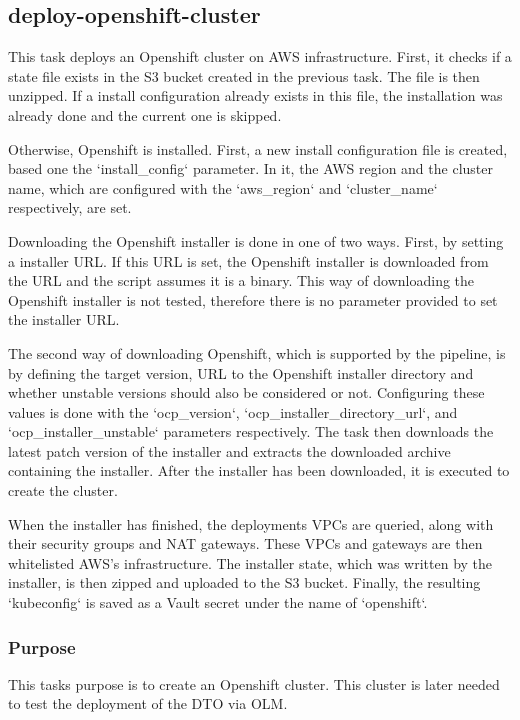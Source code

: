 \subsection{deploy-openshift-cluster}\label{subsec:deploy-openshift-cluster}

This task deploys an Openshift cluster on AWS infrastructure.
First, it checks if a state file exists in the S3 bucket created in the previous task.
The file is then unzipped.
If a install configuration already exists in this file, the installation was already done and the current one is skipped.

Otherwise, Openshift is installed.
First, a new install configuration file is created, based one the `{install_config}` parameter.
In it, the AWS region and the cluster name, which are configured with the `{aws_region}` and `{cluster_name}` respectively, are set.

Downloading the Openshift installer is done in one of two ways.
First, by setting a installer URL.
If this URL is set, the Openshift installer is downloaded from the URL and the script assumes it is a binary.
This way of downloading the Openshift installer is not tested, therefore there is no parameter provided to set the installer URL.

The second way of downloading Openshift, which is supported by the pipeline, is by defining the target version, URL to the Openshift installer directory and whether unstable versions should also be considered or not.
Configuring these values is done with the `{ocp_version}`, `{ocp_installer_directory_url}`, and `{ocp_installer_unstable}` parameters respectively.
The task then downloads the latest patch version of the installer and extracts the downloaded archive containing the installer.
After the installer has been downloaded, it is executed to create the cluster.

When the installer has finished, the deployments VPCs are queried, along with their security groups and NAT gateways.
These VPCs and gateways are then whitelisted AWS's infrastructure.
The installer state, which was written by the installer, is then zipped and uploaded to the S3 bucket.
Finally, the resulting `kubeconfig` is saved as a Vault secret under the name of `openshift`.

\subsubsection{Purpose}\label{subsubsec:doc-Purpose}

This tasks purpose is to create an Openshift cluster.
This cluster is later needed to test the deployment of the DTO via OLM.
